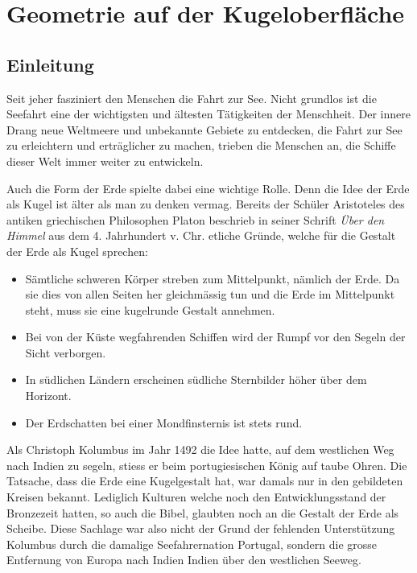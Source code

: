 \chapter{Geometrie auf der Kugeloberfläche\label{chapter:kugel}}
\begin{refsection}

\section{Einleitung}
Seit jeher fasziniert den Menschen die Fahrt zur See. Nicht grundlos ist die Seefahrt eine der wichtigsten und ältesten Tätigkeiten der Menschheit. Der innere Drang neue Weltmeere und unbekannte Gebiete zu entdecken, die Fahrt zur See zu erleichtern und erträglicher zu machen, trieben die Menschen an, die Schiffe dieser Welt immer weiter zu entwickeln.

Auch die Form der Erde spielte dabei eine wichtige Rolle. Denn die Idee der Erde als Kugel ist älter als man zu denken vermag. Bereits der Schüler Aristoteles des antiken griechischen Philosophen Platon beschrieb in seiner Schrift \textit{Über den Himmel} aus dem 4. Jahrhundert v. Chr. etliche Gründe, welche für die Gestalt der Erde als Kugel sprechen:
\begin{itemize}
      \item Sämtliche schweren Körper streben zum Mittelpunkt, nämlich der Erde. Da sie dies von allen Seiten her gleichmässig tun und die Erde im Mittelpunkt steht, muss sie eine kugelrunde Gestalt annehmen. 
\item Bei von der Küste wegfahrenden Schiffen wird der Rumpf vor den Segeln der Sicht verborgen. 
\item In südlichen Ländern erscheinen südliche Sternbilder höher über dem Horizont.
\item Der Erdschatten bei einer Mondfinsternis ist stets rund.
\end{itemize}
Als Christoph Kolumbus im Jahr 1492 die Idee hatte, auf dem westlichen Weg nach Indien zu segeln, stiess er beim portugiesischen König auf taube Ohren. 
Die Tatsache, dass die Erde eine Kugelgestalt hat, war damals nur in den gebildeten Kreisen bekannt. Lediglich Kulturen welche noch den Entwicklungsstand der Bronzezeit hatten, so auch die Bibel, glaubten noch an die Gestalt der Erde als Scheibe.
Diese Sachlage war also nicht der Grund der fehlenden Unterstützung Kolumbus durch die damalige Seefahrernation Portugal,  sondern die grosse Entfernung von Europa nach Indien Indien über den westlichen Seeweg.


\end{refsection}
